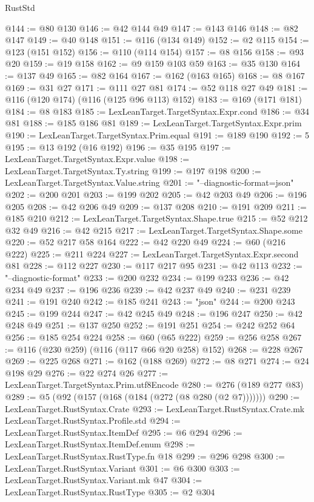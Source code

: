 \begin{lexlean}{RustStd}
\begin{coremodule}
{\begin{coremodule}
{{{{{{{{{{@144 := @80 @130
@146 := @42 @144 @49
@147 := @143 @146
@148 := @82 @147
@149 := @40 @148
@151 := @116 (@134 @149)
@152 := @2 @115
@154 := @123 (@151 @152)
@156 := @110 (@114 @154)
@157 := @8 @156
@158 := @93 @20
@159 := @19 @158
@162 := @9 @159 @103 @59
@163 := @35 @130
@164 := @137 @49
@165 := @82 @164
@167 := @162 (@163 @165)
@168 := @8 @167
@169 := @31 @27
@171 := @111 @27 @81
@174 := @52 @118 @27 @49
@181 := @116 (@120 @174) (@116 (@125 @96 @113) @152)
@183 := @169 (@171 @181)
@184 := @8 @183
@185 := LexLeanTarget.TargetSyntax.Expr.cond
@186 := @34 @81
@188 := @185 @186 @81
@189 := LexLeanTarget.TargetSyntax.Expr.prim
@190 := LexLeanTarget.TargetSyntax.Prim.equal
@191 := @189 @190
@192 := 5
@195 := @13 @192 (@16 @192)
@196 := @35 @195
@197 := LexLeanTarget.TargetSyntax.Expr.value
@198 := LexLeanTarget.TargetSyntax.Ty.string
@199 := @197 @198
@200 := LexLeanTarget.TargetSyntax.Value.string
@201 := "--diagnostic-format=json"
@202 := @200 @201
@203 := @199 @202
@205 := @42 @203 @49
@206 := @196 @205
@208 := @42 @206 @49
@209 := @137 @208
@210 := @191 @209
@211 := @185 @210
@212 := LexLeanTarget.TargetSyntax.Shape.true
@215 := @52 @212 @32 @49
@216 := @42 @215
@217 := LexLeanTarget.TargetSyntax.Shape.some
@220 := @52 @217 @58 @164
@222 := @42 @220 @49
@224 := @60 (@216 @222)
@225 := @211 @224
@227 := LexLeanTarget.TargetSyntax.Expr.second @81
@228 := @112 @227
@230 := @117 @217 @95
@231 := @42 @113
@232 := "--diagnostic-format"
@233 := @200 @232
@234 := @199 @233
@236 := @42 @234 @49
@237 := @196 @236
@239 := @42 @237 @49
@240 := @231 @239
@241 := @191 @240
@242 := @185 @241
@243 := "json"
@244 := @200 @243
@245 := @199 @244
@247 := @42 @245 @49
@248 := @196 @247
@250 := @42 @248 @49
@251 := @137 @250
@252 := @191 @251
@254 := @242 @252 @64
@256 := @185 @254 @224
@258 := @60 (@65 @222)
@259 := @256 @258
@267 := @116 (@230 @259) (@116 (@117 @66 @20 @258) @152)
@268 := @228 @267
@269 := @225 @268
@271 := @162 (@188 @269)
@272 := @8 @271
@274 := @24 @198 @29
@276 := @22 @274 @26
@277 := LexLeanTarget.TargetSyntax.Prim.utf8Encode
@280 := @276 (@189 @277 @83)
@289 := @5 (@92 (@157 (@168 (@184 (@272 (@8 @280 (@2 @7)))))))
@290 := LexLeanTarget.RustSyntax.Crate
@293 := LexLeanTarget.RustSyntax.Crate.mk LexLeanTarget.RustSyntax.Profile.std
@294 := LexLeanTarget.RustSyntax.ItemDef
@295 := @6 @294
@296 := LexLeanTarget.RustSyntax.ItemDef.enum
@298 := LexLeanTarget.RustSyntax.RustType.fn @18
@299 := @296 @298
@300 := LexLeanTarget.RustSyntax.Variant
@301 := @6 @300
@303 := LexLeanTarget.RustSyntax.Variant.mk @47
@304 := LexLeanTarget.RustSyntax.RustType
@305 := @2 @304
}}}}}}}}}}
\end{coremodule}}
\end{coremodule}
\end{lexlean}
